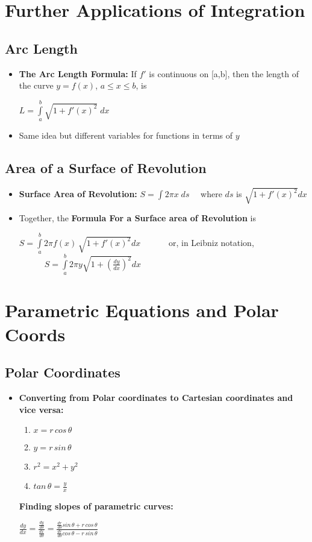 \documentclass{report}
\begin{document}
\chapter{Further Applications of Integration}
	\section{Arc Length}
		\begin{itemize}\addtolength{\leftskip}{2em}
			\item \textbf{The Arc Length Formula: }If $f'$ is continuous on [a,b], then the length of the curve $y=f(x)$, $a\le x \le b$, is
			\begin{center}
		\large	$L=\int\limits_{a}^{b}\sqrt{1+f'(x)^2}\;dx$
			\end{center}
			\item Same idea but different variables for functions in terms of $y$
		\end{itemize}
	\section{Area of a Surface of Revolution}
		\begin{itemize}\addtolength{\leftskip}{2em}
			\item \textbf{Surface Area of Revolution:} $S=\int 2\pi x\;ds\quad$ where $ds$ is $\sqrt{1+f'(x)^2}dx$
			\item Together, the \textbf{Formula For a Surface area of Revolution} is
			\begin{center}
			\large$S=\int\limits_{a}^{b}2\pi f(x)\,\sqrt{1+f'(x)^2}dx\quad\quad\quad$ or, in Leibniz notation,
			$\quad\quad\quad S=\int\limits_{a}^{b}2\pi y\sqrt{1+(\frac{dy}{dx})^2}dx$
			\end{center}
		\end{itemize}
\setcounter{chapter}{+9}
\chapter{Parametric Equations and Polar Coords}
	\setcounter{section}{+2}
	\section{Polar Coordinates}
		\begin{itemize}\addtolength{\leftskip}{2em}
			\item \textbf{Converting from Polar coordinates to Cartesian coordinates and vice versa:}
			\begin{enumerate}\addtolength{\leftskip}{4em}
				\item $x=r\,cos\,\theta$
				\item $y=r\,sin\,\theta$
				\item $r^2=x^2+y^2$
				\item $tan\,\theta=\frac{y}{x}$
			\end{enumerate}
			\textbf{Finding slopes of parametric curves: }
			\begin{center}
			\huge$\frac{dy}{dx}=\frac{\frac{dy}{d\theta}}{\frac{dx}{d\theta}}=\frac{\frac{dr}{d\theta}sin\,\theta+r\,cos\,\theta}{\frac{dr}{d\theta}cos\,\theta-r\,sin\,\theta}$
			\end{center}
		\end{itemize}
\end{document}
